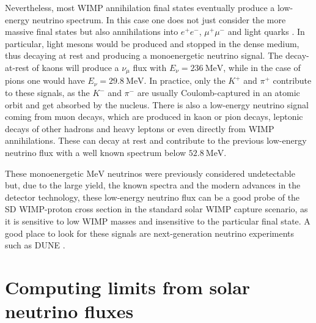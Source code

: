 Nevertheless, most WIMP annihilation final states eventually produce a low-energy neutrino spectrum.  In this case one does not just consider the more massive final states but also annihilations into $e^{+}e^{-}$, $\mu^{+}\mu^{-}$ and light quarks \cite{Bernal2012}. In particular, light mesons would be produced and stopped in the dense medium, thus decaying at rest and producing a monoenergetic neutrino signal. The decay-at-rest of kaons will produce a $\nu_{\mu}$ flux with $E_{\nu} = 236 ~ \mathrm{MeV}$, while in the case of pions one would have $E_{\nu}  = 29.8 ~ \mathrm{MeV}$. In practice, only the $K^{+}$ and $\pi^{+}$ contribute to these signals, as the $K^{-}$ and $\pi^{-}$ are usually Coulomb-captured in an atomic orbit and get absorbed by the nucleus. There is also a low-energy neutrino signal coming from muon decays, which are produced in kaon or pion decays, leptonic decays of other hadrons and heavy leptons or even directly from WIMP annihilations. These can decay at rest and contribute to the previous low-energy neutrino flux with a well known spectrum below $52.8 ~ \mathrm{MeV}$.

These monoenergetic $\mathrm{MeV}$ neutrinos were previously considered undetectable but, due to the large yield, the known spectra and the modern advances in the detector technology, these low-energy neutrino flux can be a good probe of the SD WIMP-proton cross section in the standard solar WIMP capture scenario, as it is sensitive to low WIMP masses and insensitive to the particular final state. A good place to look for these signals are next-generation neutrino experiments such as DUNE \cite{DUNE2021}.

\section{Computing limits from solar neutrino fluxes}
\label{sec:dm_analysis_limits}


